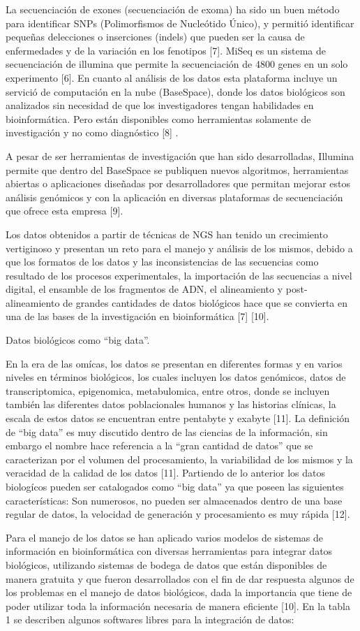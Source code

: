 La secuenciación de exones (secuenciación de exoma) ha sido un buen método para identificar SNPs (Polimorfismos de Nucleótido Único), y permitió identificar pequeñas delecciones o inserciones (indels) que pueden  ser la causa de enfermedades y de la variación en los fenotipos [7]. MiSeq es un sistema de secuenciación de illumina que permite la secuenciación de 4800 genes en un solo experimento [6]. En cuanto al análisis de los datos esta plataforma incluye un servició de computación en la nube (BaseSpace), donde los datos biológicos son analizados  sin necesidad de que los investigadores tengan habilidades en bioinformática. Pero están disponibles como herramientas solamente de investigación y no como diagnóstico [8] . 

A pesar de ser herramientas de investigación  que han sido desarrolladas, Illumina permite que dentro del BaseSpace se publiquen nuevos algoritmos, herramientas abiertas o aplicaciones diseñadas por desarrolladores que permitan mejorar estos análisis genómicos y con la aplicación en diversas plataformas de secuenciación que ofrece esta empresa [9].

Los datos obtenidos a partir de técnicas de NGS han tenido un crecimiento vertiginoso y presentan un reto para el manejo y análisis de los mismos, debido a que los formatos de los datos y las inconsistencias de las secuencias como resultado de los procesos experimentales, la importación de las secuencias a nivel digital, el ensamble de los fragmentos de ADN, el alineamiento y post-alineamiento de grandes cantidades de datos biológicos hace que se convierta en una de las bases de la investigación en bioinformática [7] [10].

Datos biológicos como “big data”.

En la era de las omícas, los datos se presentan en diferentes formas y en varios niveles en términos biológicos, los cuales incluyen los datos genómicos, datos de transcriptomica, epigenomica, metabulomica, entre otros, donde se incluyen también las diferentes datos poblacionales humanos y las historias clínicas, la escala de estos datos se encuentran  entre  pentabyte y exabyte [11]. La definición de “big data” es muy discutido dentro de las ciencias de la información, sin embargo el nombre  hace referencia a la “gran cantidad de datos” que se caracterizan por el volumen del procesamiento, la variabilidad de los mismos y la veracidad de la calidad de los datos [11]. Partiendo de lo anterior los datos biologícos pueden ser catalogados como “big data” ya que poseen las siguientes características: Son numerosos, no pueden ser almacenados dentro de una base regular de datos, la velocidad  de generación y procesamiento es muy rápida [12].

Para el manejo de los datos se han aplicado varios modelos de sistemas de información en  bioinformática con diversas herramientas para integrar datos biológicos, utilizando sistemas de bodega de datos que están disponibles de manera gratuita y que fueron desarrollados con el fin de dar respuesta algunos de los problemas en el manejo de datos biológicos, dada la importancia que tiene de poder utilizar toda la información necesaria de manera eficiente [10]. En la tabla 1 se describen algunos softwares libres para la integración de datos:
